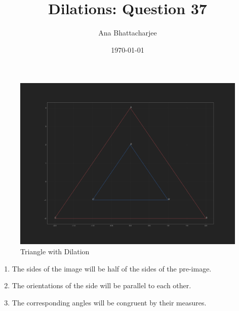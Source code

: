 \documentclass{article}
\begin{document}
\title{Dilations: Question 37}
\author{Ana Bhattacharjee}
\date{\today}
\maketitle{}
\begin{center}
\begin{figure}[!htbp]
  \includegraphics[width=1.0\columnwidth]{../q37}
  \caption{Triangle with Dilation}
\end{figure}
\begin{enumerate}[label=(\alph*)]
  \item The sides of the image will be half of the sides of the pre-image.
  \item The orientations of the side will be parallel to each other.
  \item The corresponding angles will be congruent by their measures. 
\end{enumerate}
\end{center}
\end{document}
